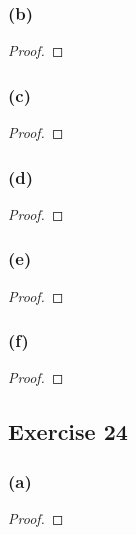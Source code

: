 \documentclass[14pt]{extarticle}
\begin{document}
\subsubsection{(b)}

\begin{proof}

\end{proof}

\subsubsection{(c)}

\begin{proof}

\end{proof}

\subsubsection{(d)}

\begin{proof}

\end{proof}

\subsubsection{(e)}

\begin{proof}

\end{proof}

\subsubsection{(f)}

\begin{proof}

\end{proof}

\subsection{Exercise 24}

\subsubsection{(a)}

\begin{proof}

\end{proof}
\end{document}
